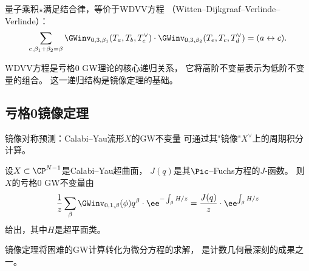 \begin{theorem}[结合律]\label{thm:assoc}
量子乘积$\star$满足结合律，等价于WDVV方程
（Witten--Dijkgraaf--Verlinde--Verlinde）：
\[
\sum_{e, \beta_1+\beta_2=\beta}
\GWinv_{0,3,\beta_1}(T_a, T_b, T_e^\vee) \cdot
\GWinv_{0,3,\beta_2}(T_e, T_c, T_d^\vee)
= (a \leftrightarrow c).
\]
\end{theorem}

WDVV方程是亏格0 GW理论的核心递归关系，
它将高阶不变量表示为低阶不变量的组合。
这一递归结构是镜像定理的基础。

\subsection{亏格0镜像定理}

镜像对称预测：Calabi--Yau流形$X$的GW不变量
可通过其"镜像"$X^\vee$上的周期积分计算。

\begin{theorem}\label{thm:mirror}
设$X \subset \CP^{N-1}$是Calabi--Yau超曲面，
$J(q)$是其$\Pic$--Fuchs方程的$J$-函数。
则$X$的亏格0 GW不变量由
\[
\frac{1}{z} \sum_{\beta} \GWinv_{0,1,\beta}(\phi) q^\beta \cdot \ee^{-\int_\beta H/z}
= \frac{J(q)}{z} \cdot \ee^{\int_\beta H/z}
\]
给出，其中$H$是超平面类。
\end{theorem}

镜像定理将困难的GW计算转化为微分方程的求解，
是计数几何最深刻的成果之一。
